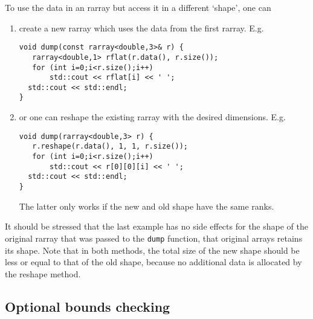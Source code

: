\documentclass[11pt,twoside]{article}
\begin{document}
To use the data in an rarray but access it in a different `shape', one can
\begin{enumerate}
  \item create a new rarray which uses the data from the first rarray. E.g.
\vspace{-9pt}
\begin{framed}\vspace{-3pt}%
\begin{verbatim}
void dump(const rarray<double,3>& r) {
   rarray<double,1> rflat(r.data(), r.size());
   for (int i=0;i<r.size();i++)
       std::cout << rflat[i] << ' ';
  std::cout << std::endl;
}
\end{verbatim}%
\vspace{-12pt}
\end{framed}\vspace{-8pt}
\item or one can reshape the existing rarray with the desired dimensions. E.g.
\vspace{-2pt}
\begin{framed}\vspace{-4pt}%
\begin{verbatim}
void dump(rarray<double,3> r) {
   r.reshape(r.data(), 1, 1, r.size());
   for (int i=0;i<r.size();i++)
       std::cout << r[0][0][i] << ' ';
  std::cout << std::endl;
}
\end{verbatim}%
\vspace{-12pt}
\end{framed}\vspace{-8pt}
The latter only works if the new and old shape have the same ranks.
\end{enumerate}
It should be stressed that the last example has no side effects for
the shape of the original rarray that was passed to the \texttt{dump}
function, that original arrays retains its shape.
Note that in both methods, the total size of the new shape should be
less or equal to that of the old shape, because no additional data is
allocated by the reshape method.

\subsection{Optional bounds checking}
\end{document}
